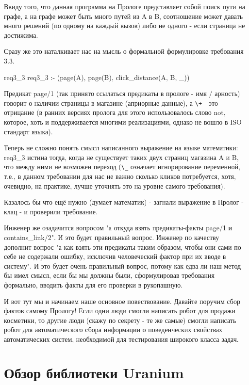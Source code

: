 \documentclass[a4paper]{book}
\def\te{т.\thinspace е.}
\def\ur{Uranium}
\begin{document}
Ввиду того, что данная программа на Прологе представляет собой
поиск пути на графе, а на графе может быть много путей из A в B,
соотношение может давать много решений (по одному на каждый
вызов) либо не одного - если страница не достижима.

Сразу же это наталкивает нас на мысль о формальной формулировке
требования 3.3.

\begin{example}{req3\_3}{}
req3_3 :- \+ (page(A), page(B), \+ click_distance(A, B, _))
\end{example}

Предикат page/1 (так принято ссылаться предикаты в прологе - имя
/ арность) говорит о наличии страницы в магазине (априорные
данные), а \verb|\+| - это отрицание (в ранних версиях пролога
для этого использовалось слово not, которое, хоть и
поддерживается многими реализациями, однако не вошло в ISO
стандарт языка).

Теперь не сложно понять смысл написанного выражение на языке
математики: req3\_3 истина тогда, когда не существует таких двух
страниц магазина A и B, что между ними не возможен переход
(\verb|\_| означает игнорирование переменной, \te, в данном
требовании для нас не важно сколько кликов потребуется, хотя,
очевидно, на практике, лучше уточнять это на уровне самого
требования).

Казалось бы что ещё нужно (думает математик) - загнали выражение
в Пролог - клац - и проверили требование.

Инженер же озадачится вопросом "а откуда взять предикаты-факты
page/1 и contains\_link/2". И это будет правильный
вопрос. Инженер по качеству дополнит вопрос "а как взять эти
предикаты таким образом, чтобы они сами по себе не содержали
ошибку, исключив человеческий фактор при их вводе в систему". И
это будет очень правильный вопрос, потому как едва ли наш метод
бы имел смысл, если бы мы должны были, сформулировав требования
формально, вводить факты для его проверки в рукопашную.

И вот тут мы и начинаем наше основное повествование.  Давайте
поручим сбор фактов самому Прологу! Если одни люди смогли
написать робот для продажи косметики, то другие люди (скажу по
секрету - те же самые) смогли написать робот для автоматического
сбора информации о поведенческих свойствах автоматических систем,
необходимой для тестирования широкого класса задач.


\chapter{Обзор библиотеки \ur}
\end{document}
